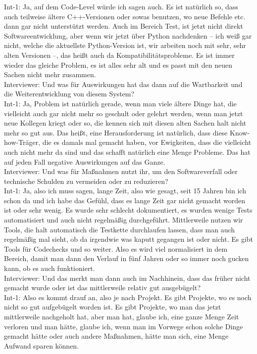 Int-1: Ja, auf dem Code-Level würde ich sagen auch. Es ist natürlich so, dass auch teilweise ältere C++-Versionen oder sowas benutzen, wo neue Befehle etc. dann gar nicht unterstützt werden. Auch im Bereich Test, ist jetzt nicht direkt Softwareentwicklung, aber wenn wir jetzt über Python nachdenken – ich weiß gar nicht, welche die aktuellste Python-Version ist, wir arbeiten noch mit sehr, sehr alten Versionen –, das heißt auch da Kompatibilitätsprobleme. Es ist immer wieder das gleiche Problem, es ist alles sehr alt und es passt mit den neuen Sachen nicht mehr zusammen.\\
Interviewer: Und was für Auswirkungen hat das dann auf die Wartbarkeit und die Weiterentwicklung von diesem System?\\
Int-1: Ja, Problem ist natürlich gerade, wenn man viele ältere Dinge hat, die vielleicht auch gar nicht mehr so geschult oder gelehrt werden, wenn man jetzt neue Kollegen kriegt oder so, die kennen sich mit diesen alten Sachen halt nicht mehr so gut aus. Das heißt, eine Herausforderung ist natürlich, dass diese Know-how-Träger, die es damals mal gemacht haben, vor Ewigkeiten, dass die vielleicht auch nicht mehr da sind und das schafft natürlich eine Menge Probleme. Das hat auf jeden Fall negative Auswirkungen auf das Ganze.\\
Interviewer: Und was für Maßnahmen nutzt ihr, um den Softwareverfall oder technische Schulden zu vermeiden oder zu reduzieren?\\
Int-1: Ja, also ich muss sagen, lange Zeit, also wie gesagt, seit 15 Jahren bin ich schon da und ich habe das Gefühl, dass es lange Zeit gar nicht gemacht worden ist oder sehr wenig. Es wurde sehr schlecht dokumentiert, es wurden wenige Tests automatisiert und auch nicht regelmäßig durchgeführt. Mittlerweile nutzen wir Tools, die halt automatisch die Testkette durchlaufen lassen, dass man auch regelmäßig mal sieht, ob da irgendwie was kaputt gegangen ist oder nicht. Es gibt Tools für Codechecks und so weiter. Also es wird viel normalisiert in dem Bereich, damit man dann den Verlauf in fünf Jahren oder so immer noch gucken kann, ob es auch funktioniert.\\
Interviewer: Und das merkt man dann auch im Nachhinein, dass das früher nicht gemacht wurde oder ist das mittlerweile relativ gut ausgebügelt?\\
Int-1: Also es kommt drauf an, also je nach Projekt. Es gibt Projekte, wo es noch nicht so gut aufgebügelt worden ist. Es gibt Projekte, wo man das jetzt mittlerweile nachgeholt hat, aber man hat, glaube ich, eine ganze Menge Zeit verloren und man hätte, glaube ich, wenn man im Vorwege schon solche Dinge gemacht hätte oder auch andere Maßnahmen, hätte man sich, eine Menge Aufwand sparen können.\\

